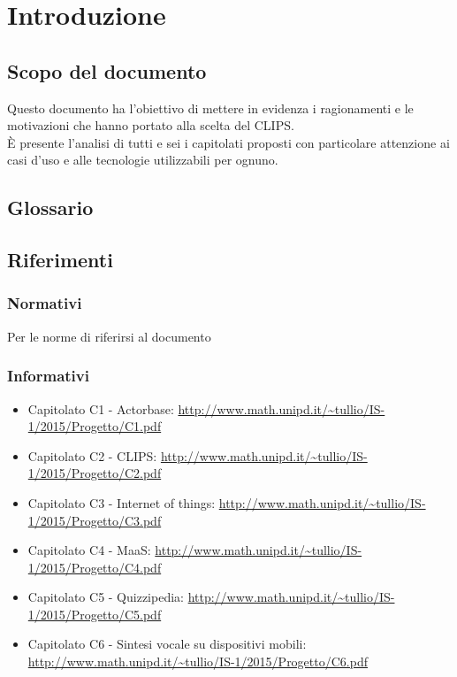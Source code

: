 \section{Introduzione}
\subsection{Scopo del documento}

Questo documento ha l'obiettivo di mettere in evidenza i ragionamenti e le motivazioni che hanno portato alla scelta del  CLIPS.\\
È presente l'analisi di tutti e sei i capitolati proposti con particolare attenzione ai casi d'uso e alle tecnologie utilizzabili per ognuno.

\subsection{Glossario}
\GLOSSARIO

\subsection{Riferimenti}
\subsubsection{Normativi}
Per le norme di  riferirsi al documento \NPdoc
\subsubsection{Informativi}
\begin{itemize}
	\item Capitolato C1 - Actorbase: \url{http://www.math.unipd.it/~tullio/IS-1/2015/Progetto/C1.pdf}
	\item Capitolato C2 - CLIPS: \url{http://www.math.unipd.it/~tullio/IS-1/2015/Progetto/C2.pdf}
	\item Capitolato C3 - Internet of things: \url{http://www.math.unipd.it/~tullio/IS-1/2015/Progetto/C3.pdf}
	\item Capitolato C4 - MaaS: \url{http://www.math.unipd.it/~tullio/IS-1/2015/Progetto/C4.pdf}
	\item Capitolato C5 - Quizzipedia: \url{http://www.math.unipd.it/~tullio/IS-1/2015/Progetto/C5.pdf}
	\item Capitolato C6 - Sintesi vocale su dispositivi mobili: \url{http://www.math.unipd.it/~tullio/IS-1/2015/Progetto/C6.pdf}
\end{itemize}